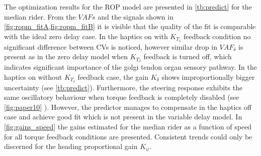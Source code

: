 The optimization results for the ROP model are presented in \cref{tb:predict} for the median rider. From the \ensuremath{\mathit{VAF}s} and the signals shown in \cref{fig:ropm_fitA,fig:ropm_fitB} it is visible that the quality of the fit is comparable with the ideal zero delay case. In the haptics on with \ensuremath{K_{T_\delta}} feedback condition no significant difference between CVs is noticed, however similar drop in \ensuremath{\mathit{VAF}_\delta} is present as in the zero delay model when  \ensuremath{K_{T_\delta}} feedback is turned off, which indicates significant importance of the golgi tendon organ sensory pathway. In the haptics on without \ensuremath{K_{T_\delta}} feedback case, the gain \ensuremath{K_{\delta}} shows improportionally bigger uncertainty (see \cref{tb:predict}). Furthermore, the steering response exhibits  the same oscillatory behaviour when torque feedback is completely disabled (see \cref{fig:paper10} ). However, the predictor manages to compensate in the haptics off case and achieve good fit which is not present in the variable delay model. In \cref{fig:gains_speed} the gains estimated for the median rider as a function of speed for all torque feedback conditions are presented. Consistent trends could only be discerned for the heading proportional gain \ensuremath{K_\psi}.


